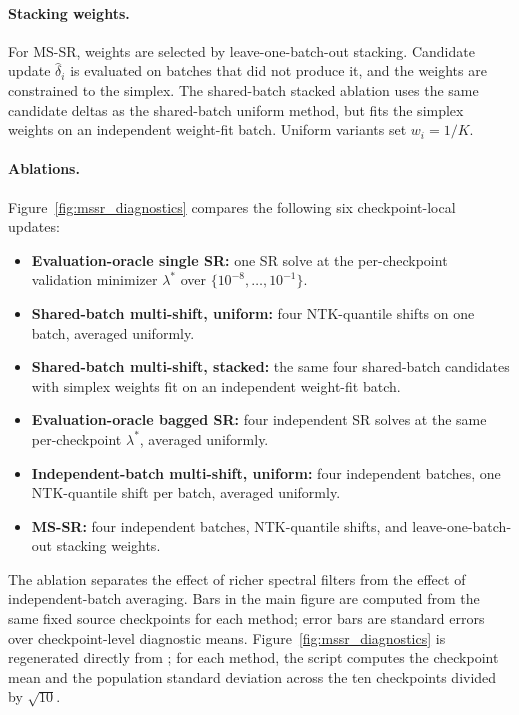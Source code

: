 \paragraph{Stacking weights.}
For MS-SR, weights are selected by leave-one-batch-out stacking. Candidate
update \(\hat\delta_i\) is evaluated on batches that did not produce it, and the
weights are constrained to the simplex. The shared-batch stacked ablation uses the
same candidate deltas as the shared-batch uniform method, but fits the simplex
weights on an independent weight-fit batch. Uniform variants set
\(w_i=1/K\).

\paragraph{Ablations.}
Figure~\ref{fig:mssr_diagnostics} compares the following six checkpoint-local
updates:
\begin{itemize}
    \item \textbf{Evaluation-oracle single SR:} one SR solve at the
    per-checkpoint validation minimizer $\lambda^*$ over
    $\{10^{-8},\ldots,10^{-1}\}$.
    \item \textbf{Shared-batch multi-shift, uniform:} four NTK-quantile shifts on
    one batch, averaged uniformly.
    \item \textbf{Shared-batch multi-shift, stacked:} the same four shared-batch
    candidates with simplex weights fit on an independent weight-fit batch.
    \item \textbf{Evaluation-oracle bagged SR:} four independent SR solves at
    the same per-checkpoint $\lambda^*$, averaged uniformly.
    \item \textbf{Independent-batch multi-shift, uniform:} four independent
    batches, one NTK-quantile shift per batch, averaged uniformly.
    \item \textbf{MS-SR:} four independent batches, NTK-quantile shifts, and
    leave-one-batch-out stacking weights.
\end{itemize}
The ablation separates the effect of richer spectral filters from the effect of
independent-batch averaging. Bars in the main figure are computed from the same
fixed source checkpoints for each method; error bars are standard errors over
checkpoint-level diagnostic means. Figure~\ref{fig:mssr_diagnostics} is
regenerated directly from
; for each method,
the script computes the checkpoint mean and the population standard deviation
across the ten checkpoints divided by $\sqrt{10}$.

